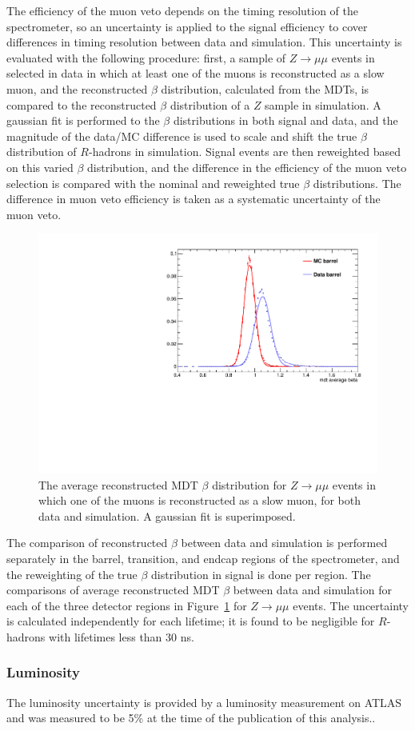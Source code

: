 The efficiency of the muon veto depends on the timing resolution of the spectrometer, so an uncertainty is applied to the signal efficiency
to cover differences in timing resolution between data and simulation. 
This uncertainty is evaluated with the following procedure: first, a sample of $Z\rightarrow\mu\mu$ events in selected in data in which at least one of the muons is reconstructed as a slow muon, and the reconstructed $\beta$ distribution, calculated from the MDTs, is compared to the reconstructed $\beta$ distribution of a $Z$ sample in simulation. 
A gaussian fit is performed to the $\beta$ distributions in both signal and data, and the magnitude of the data/MC difference is used to scale and shift the true $\beta$ distribution of $R$-hadrons in simulation. 
Signal events are then reweighted based on this varied $\beta$ distribution, and the difference in the efficiency of the muon veto selection is compared with the nominal and reweighted true $\beta$ distributions. 
The difference in muon veto efficiency is taken as a systematic uncertainty of the muon veto. 

\begin{figure}
\centering
\includegraphics[width=.32\columnwidth]{figures/mdtBeta_barrel_dataMc.pdf}
\caption{The average reconstructed MDT $\beta$ distribution for $Z\rightarrow\mu\mu$ events in which one of the muons is reconstructed as a slow muon, for both data and simulation. A gaussian fit is superimposed.}
\label{fig:mdt_beta}
\end{figure}
 
The comparison of reconstructed $\beta$ between data and simulation is performed separately in the barrel, transition, and endcap regions of the spectrometer, and the reweighting of the true $\beta$ distribution in signal is done per region. 
The comparisons of average reconstructed MDT $\beta$ between data and simulation for each of the three detector regions in Figure~\ref{fig:mdt_beta} for $Z\rightarrow\mu\mu$ events.
The uncertainty is calculated independently for each lifetime; it is found to be negligible for $R$-hadrons with lifetimes less than 30 ns.

\subsubsection{Luminosity}
The luminosity uncertainty is provided by a luminosity measurement on \ac{ATLAS} and was measured to be 5\% at the time of the publication of this analysis..

